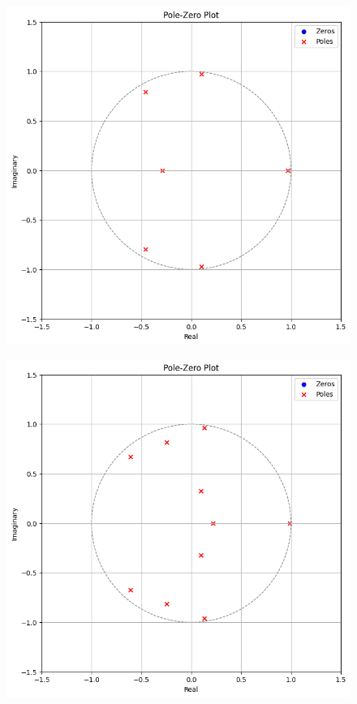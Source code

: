 \documentclass{article}
\begin{document}
\begin{figure}[H]
\begin{center}
\includegraphics[scale = 0.8]{p6_2.png}
\end{center}
\end{figure}

\begin{figure}[H]
\begin{center}
\includegraphics[scale = 0.8]{p10_2.png}
\end{center}
\end{figure}
\end{document}

